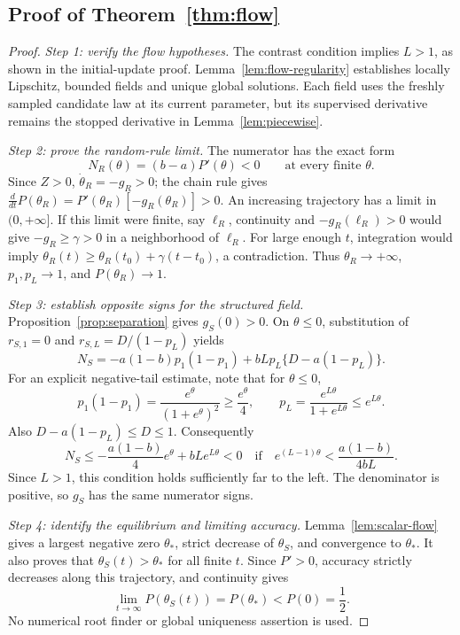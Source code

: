 \subsection{Proof of Theorem~\ref{thm:flow}}
\begin{proof}
\textit{Step 1: verify the flow hypotheses.}
The contrast condition implies $L>1$, as shown in the initial-update
proof. Lemma~\ref{lem:flow-regularity} establishes locally Lipschitz,
bounded fields and unique global solutions. Each field uses the freshly
sampled candidate law at its current parameter, but its supervised
derivative remains the stopped derivative in Lemma~\ref{lem:piecewise}.

\textit{Step 2: prove the random-rule limit.}
The numerator has the exact form
\[
 N_R(\theta)=(b-a)P'(\theta)<0
 \qquad\text{at every finite }\theta.
\]
Since $Z>0$, $\dot\theta_R=-g_R>0$; the chain rule gives
$\frac{d}{dt}P(\theta_R)=P'(\theta_R)[-g_R(\theta_R)]>0$.
An increasing trajectory has a limit in $(0,+\infty]$. If this limit were
finite, say $\ell_R$, continuity and $-g_R(\ell_R)>0$ would give
$-g_R\geq\gamma>0$ in a neighborhood of $\ell_R$. For large enough $t$,
integration would imply
$\theta_R(t)\geq\theta_R(t_0)+\gamma(t-t_0)$, a contradiction.
Thus $\theta_R\to+\infty$, $p_1,p_L\to1$, and $P(\theta_R)\to1$.

\textit{Step 3: establish opposite signs for the structured field.}
Proposition~\ref{prop:separation} gives $g_S(0)>0$. On $\theta\leq0$,
substitution of $r_{S,1}=0$ and $r_{S,L}=D/(1-p_L)$ yields
\begin{equation}
 N_S=-a(1-b)p_1(1-p_1)+bL p_L\{D-a(1-p_L)\}.
 \label{eq:app-negative-numerator}
\end{equation}
For an explicit negative-tail estimate, note that for $\theta\leq0$,
\[
 p_1(1-p_1)=\frac{e^\theta}{(1+e^\theta)^2}\geq\frac{e^\theta}{4},
 \qquad p_L=\frac{e^{L\theta}}{1+e^{L\theta}}\leq e^{L\theta}.
\]
Also $D-a(1-p_L)\leq D\leq1$. Consequently
\begin{equation}
 N_S\leq-\frac{a(1-b)}4e^\theta+bL e^{L\theta}<0
 \quad\text{if}\quad e^{(L-1)\theta}<\frac{a(1-b)}{4bL}.
 \label{eq:app-negative-tail}
\end{equation}
Since $L>1$, this condition holds sufficiently far to the left. The
denominator is positive, so $g_S$ has the same numerator signs.

\textit{Step 4: identify the equilibrium and limiting accuracy.}
Lemma~\ref{lem:scalar-flow} gives a largest negative zero $\theta_*$,
strict decrease of $\theta_S$, and convergence to $\theta_*$. It also
proves that $\theta_S(t)>\theta_*$ for all finite $t$. Since $P'>0$,
accuracy strictly decreases along this trajectory, and continuity gives
\[
 \lim_{t\to\infty}P(\theta_S(t))=P(\theta_*)<P(0)=\frac12.
\]
No numerical root finder or global uniqueness assertion is used.


\end{proof}
